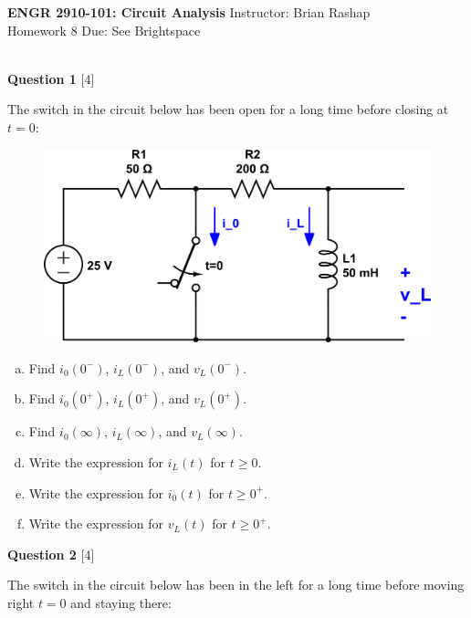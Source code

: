 \documentclass[12pt]{article}
\begin{document}
\begin{center}
\hfil
{\large\bf {ENGR 2910-101: Circuit Analysis}}
\hfill Instructor: Brian Rashap\\
Homework 8  \hfill Due: See Brightspace\\
\hrulefill\\
\end{center}

{\bf Question 1} [4] %

The switch in the circuit below has been open for a long time before closing at $t=0$:

\begin{figure}[h!]
\begin{center}
 \includegraphics[scale=0.4]{p7_4.png}
\end{center}
\end{figure}

\begin{enumerate}[(a)]
\item Find $i_0(0^-)$, $i_L(0^-)$, and $v_L(0^-)$.
\item Find $i_0(0^+)$, $i_L(0^+)$, and $v_L(0^+)$.
\item Find $i_0(\infty)$, $i_L(\infty)$, and $v_L(\infty)$.
\item Write the expression for $i_L(t)$ for $t \geq 0$.
\item Write the expression for $i_0(t)$ for $t \geq 0^+$.
\item Write the expression for $v_L(t)$ for $t \geq 0^+$.
\end{enumerate}


\vspace{0.1in}


{\bf Question 2} [4] %

The switch in the circuit below has been in the left for a long time before moving right $t=0$ and staying there:
\end{document}
